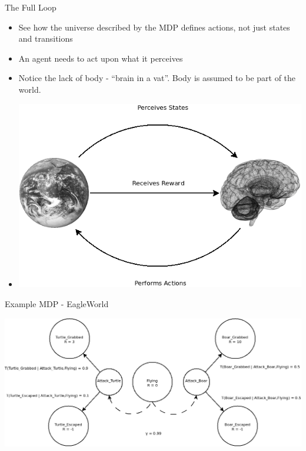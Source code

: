 \documentclass[]{beamer}
\providecommand{\tightlist}{%
  \setlength{\itemsep}{0pt}\setlength{\parskip}{0pt}}
\begin{document}
\begin{frame}{The Full Loop}

\begin{itemize}
\tightlist
\item
  See how the universe described by the MDP defines actions, not just
  states and transitions
\item
  An agent needs to act upon what it perceives
\item
  Notice the lack of body - ``brain in a vat''. Body is assumed to be
  part of the world.
\item
  \includegraphics[scale=0.33]{figures/RL.png}
\end{itemize}

\end{frame}

\begin{frame}{Example MDP - EagleWorld}

\center
\includegraphics[scale=0.33]{figures/MDPExample-simple2.png}

\end{frame}
\end{document}
